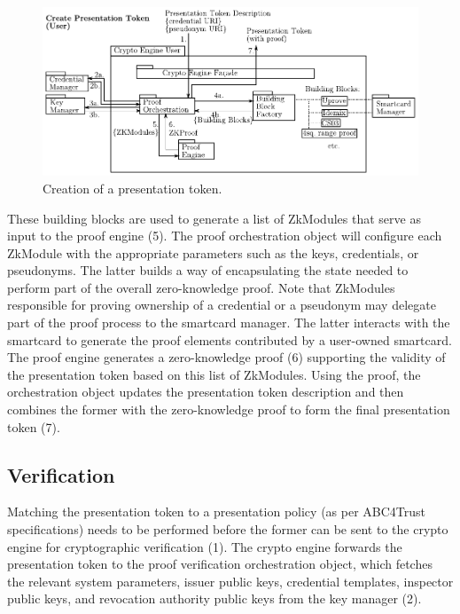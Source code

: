 \begin{figure}[htbp]
\includegraphics[width=\textwidth]{img/01.pdf}
\caption{Creation of a presentation token.}
\label{fig:presentation}
\end{figure}

These building blocks are used to generate a list of ZkModules that serve as input
to the proof engine (5).
%
The proof orchestration object will configure each ZkModule with the appropriate 
parameters such as the  keys, credentials, or pseudonyms.
The latter builds  a way of encapsulating the state needed to perform part of the overall 
zero-knowledge proof.
Note that ZkModules responsible for
proving ownership of a credential or a pseudonym may delegate part of the proof process 
to the smartcard manager.
The latter interacts with the smartcard to generate the proof elements contributed by a 
user-owned smartcard.
%
The proof engine generates a zero-knowledge proof (6) supporting the validity of the 
presentation token based on this list of ZkModules.
%
Using the proof, the orchestration object updates the presentation token description 
and then combines the former with the zero-knowledge
proof to form the final presentation token (7).




\subsection{Verification}
\label{sec:arch:verification}


Matching the presentation token to a presentation policy (as per ABC4Trust specifications) needs
to be performed before the former can be sent to the crypto engine for 
cryptographic verification (1).
%
The crypto engine forwards the
presentation token to the proof verification orchestration object, which fetches
the relevant system parameters, issuer public keys, credential
templates, inspector public keys, and revocation authority public keys from the key manager (2).



